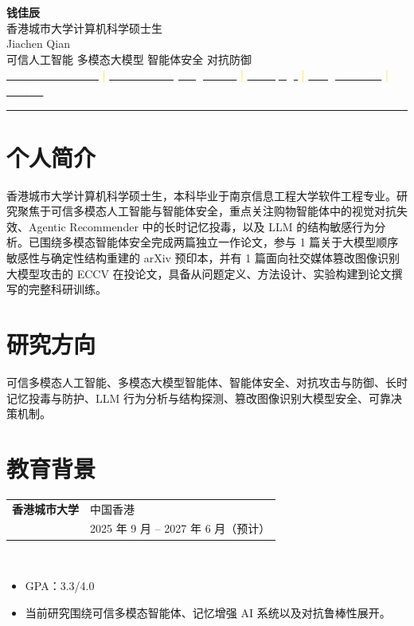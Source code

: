 \documentclass[10pt,a4paper]{ctexart}
\makeatletter
\newcommand{\resumeSubheading}[4]{
  \begin{tabular*}{\textwidth}{@{}>{\raggedright\arraybackslash}p{0.68\textwidth}@{\extracolsep{\fill}}>{\raggedleft\arraybackslash}p{0.27\textwidth}@{}}
  \textbf{#1} & #2 \\
  {\color{accentsoft}\small #3} & {\color{accentsoft}\small #4}
  \end{tabular*}\\[-0.18em]
}
\newcommand{\headerlink}[2]{\href{#1}{\textcolor{white}{#2}}}
\makeatother
\begin{document}
\begingroup
\setlength{\fboxsep}{12pt}
\noindent\colorbox{accent}{%
\parbox{\dimexpr\textwidth-2\fboxsep\relax}{%
  {\fontsize{25}{27}\selectfont\color{white}\bfseries 钱佳辰} \\
  \vspace{0.18em}
  {\small\color{white}香港城市大学计算机科学硕士生} \\
  {\small\color{white!88}Jiachen Qian} \\
  \vspace{0.2em}
  {\footnotesize\color{gold}可信人工智能 \textbar{} 多模态大模型 \textbar{} 智能体安全 \textbar{} 对抗防御} \\
  \vspace{0.35em}
  {\footnotesize \headerlink{tel:+8613862215800}{+86 138 6221 5800} \enspace
  \textcolor{gold}{|} \enspace
  \headerlink{mailto:72510756@cityu-dg.edu.cn}{72510756@cityu-dg.edu.cn} \enspace
  \textcolor{gold}{|} \enspace
  \headerlink{https://qianjiachen.github.io/homepage/}{Homepage} \enspace
  \textcolor{gold}{|} \enspace
  \headerlink{https://scholar.google.com/citations?user=zN0XzvAAAAAJ\&hl=zh-CN}{Google Scholar} \enspace
  \textcolor{gold}{|} \enspace
  \headerlink{https://github.com/qianjiachen}{GitHub}} \\
  \vspace{0.2em}
  \textcolor{gold}{\rule{\linewidth}{0.8pt}}
}}
\endgroup

\vspace{0.5em}

\section*{个人简介}
香港城市大学计算机科学硕士生，本科毕业于南京信息工程大学软件工程专业。研究聚焦于可信多模态人工智能与智能体安全，重点关注购物智能体中的视觉对抗失效、Agentic Recommender 中的长时记忆投毒，以及 LLM 的结构敏感行为分析。已围绕多模态智能体安全完成两篇独立一作论文，参与 1 篇关于大模型顺序敏感性与确定性结构重建的 arXiv 预印本，并有 1 篇面向社交媒体篡改图像识别大模型攻击的 ECCV 在投论文，具备从问题定义、方法设计、实验构建到论文撰写的完整科研训练。

\section*{研究方向}
可信多模态人工智能、多模态大模型智能体、智能体安全、对抗攻击与防御、长时记忆投毒与防护、LLM 行为分析与结构探测、篡改图像识别大模型安全、可靠决策机制。

\section*{教育背景}
\resumeSubheading{香港城市大学}{中国香港}{计算机科学硕士}{2025 年 9 月 -- 2027 年 6 月（预计）}
\begin{itemize}
  \item GPA：3.3/4.0
  \item 当前研究围绕可信多模态智能体、记忆增强 AI 系统以及对抗鲁棒性展开。
\end{itemize}
\end{document}
